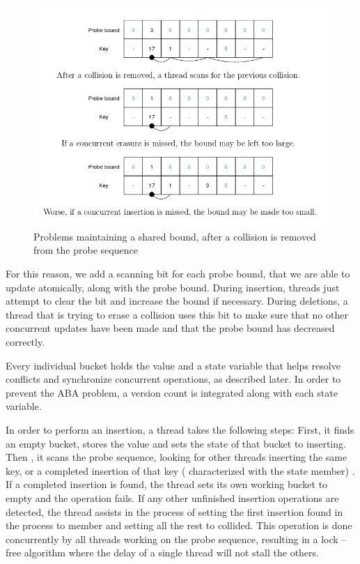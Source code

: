 \begin{figure}
 \centering
  \includegraphics[scale=0.5]{non_blocking_1.png}
\caption{Problems maintaining a shared bound, after a collision is removed from the probe sequence}
\label{non_blocking_1}
\end{figure}

For this reason, we add a scanning bit for each probe bound, that we are able to update atomically, along with the probe bound. During insertion, threads just attempt to clear the bit and increase the bound if necessary. During deletions, a thread that is trying to erase a collision uses this bit to make sure that no other concurrent  updates have been made and that the probe bound has decreased correctly.

Every individual bucket holds the value and a state variable that helps resolve conflicts and synchronize concurrent operations, as described later. In order to prevent the ABA  problem, a version count is integrated along with each state variable.

In order to perform an insertion, a thread takes the following steps: First, it finds an empty bucket, stores the value and sets the state of that bucket to inserting. Then , it scans the probe sequence, looking for other threads inserting the same key, or a completed insertion of that key  ( characterized with the state member) . If a completed insertion is found, the thread sets its own working bucket to empty and the operation fails. If any other unfinished insertion operations are detected, the thread assists in the process of setting the first insertion found in the process to member and setting all the rest to collided. This operation is done concurrently by all threads working on the probe sequence, resulting in a lock –free algorithm where the delay of a single thread will not stall the others.


